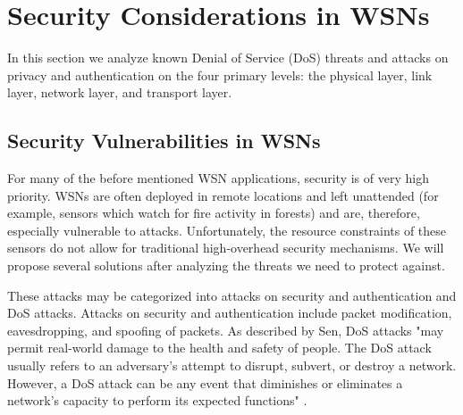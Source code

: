 \documentclass[12pt,a4paper,twoside]{report}
\begin{document}
\section{Security Considerations in WSNs}
\label{sec:security}
In this section we analyze known Denial of Service (DoS) threats and attacks on privacy and authentication on the four primary levels: the physical layer, link layer, network layer, and transport layer. 
\subsection{Security Vulnerabilities in WSNs}
For many of the before mentioned WSN applications, security is of very high priority. WSNs are often deployed in remote locations and left unattended (for example, sensors which watch for fire activity in forests) and are, therefore, especially vulnerable to attacks. Unfortunately, the resource constraints of these sensors do not allow for traditional high-overhead security mechanisms. We will propose several solutions after analyzing the threats we need to protect against. \par
These attacks may be categorized into attacks on security and authentication and DoS attacks. Attacks on security and authentication include packet modification, eavesdropping, and spoofing of packets. As described by Sen, DoS attacks "may permit real-world damage to the health and safety of people. The DoS attack usually refers to an adversary's attempt to disrupt, subvert, or destroy a network. However, a DoS attack can be any event that diminishes or eliminates a network's capacity to perform its expected functions" \cite{sen:2009}.\par
\end{document}
